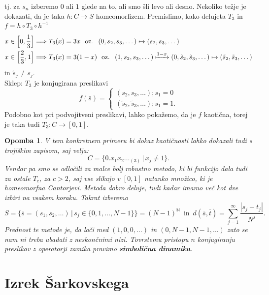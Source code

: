\documentclass{article}
\newtheorem{opomba}{Opomba}
\newcommand{\N}{\mathbb{N}}
\begin{document}
tj. za $s_n$ izberemo $0$ ali $1$ glede na to, ali smo šli levo ali desno. 
Nekoliko težje je dokazati, da je taka $h: C \rightarrow S$ homeomorfizem.
Premislimo, kako delujeta $T_3$ in $f = h\circ T_3 \circ h^{-1}$
\begin{align*}
&x\in \Big[0, \frac{1}{3}\Big] \Longrightarrow T_3(x) = 3x \,\,\text{ oz. }\,\,  (0, s_2, s_3, \dots) \mapsto (s_2, s_3, \dots) \\
&x\in \Big[\frac{2}{3}, 1\Big] \Longrightarrow T_3(x) = 3(1-x) \,\,\text{ oz. }\,\,  (1, s_2, s_3, \dots) \xmapsto{1-x} (0, \tilde{s}_2, \tilde{s}_3, \dots) \mapsto (\tilde{s}_2, \tilde{s}_3, \dots)
\end{align*}
in $\tilde{s}_j \neq s_j$. \\
Sklep: $T_3$ je konjugirana preslikavi 
$$
f(\bar{s})=\left\{\begin{array}{l}
    \left(s_2, s_3, \ldots\right) ; s_1=0 \\
    \left(\tilde{s}_2, \tilde{s}_3, \ldots\right) ; s_1=1.
\end{array}\right.
$$
Podobno kot pri podvojitveni preslikavi, lahko pokažemo, da je $f$ kaotična, torej 
je taka tudi $T_3: C \rightarrow [0, 1]$.

\begin{opomba}
V tem konkretnem primeru bi dokaz kaotičnosti lahko dokazali tudi s 
trojiškim zapisom, saj velja:
$$
C = \{0. x_1 x_2 \dots_{(3)} \,|\, x_j \neq 1\}.
$$
Vendar pa smo se odločili za malce bolj robustno metodo, ki bi funkcijo 
dala tudi za ostale $T_c$, za $c>2$, saj vse slikajo v $[0, 1]$ natanko 
množico, ki je homeomorfna Cantorjevi. Metoda dobro deluje, 
tudi kadar imamo več kot dve izbiri na vsakem koraku. Takrat izberemo 
$$
S = \{ \overline{s} = (s_1, s_2, \dots) \,|\, s_j \in \{0, 1, \dots, N-1\}\} = (N-1)^\N \, \text{ in }
\, d(\overline{s}, \overline{t}) = \sum_{j=1}^\infty \frac{|s_j - t_j|}{N^j}.
$$
Prednost te metode je, da loči med $(1, 0, 0, \dots)$ in $(0, N-1, N-1, \dots)$
zato se nam ni treba ubadati z neskončnimi nizi. Tovrstemu pristopu 
$n$ konjugiranju preslikav z operatorji zamika pravimo \textbf{simbolična dinamika}.
\end{opomba}

\section{Izrek Šarkovskega}
\end{document}
